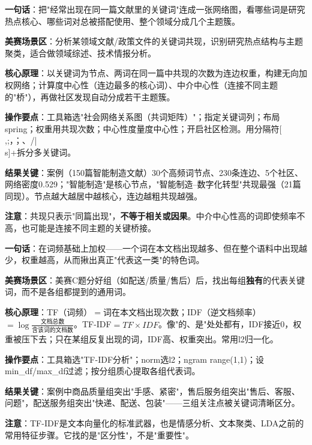\begin{algobrief}
\textbf{一句话}：把"经常出现在同一篇文献里的关键词"连成一张网络图，看哪些词是研究热点核心、哪些词对总被搭配使用、整个领域分成几个主题簇。

\textbf{美赛场景区}：分析某领域文献/政策文件的关键词共现，识别研究热点结构与主题聚类，适合做领域综述、技术情报分析。

\textbf{核心原理}：以关键词为节点、两词在同一篇中共现的次数为连边权重，构建无向加权网络；计算度中心性（连边最多的核心词）、中介中心性（连接不同主题的"桥"），再做社区发现自动分成若干主题簇。

\textbf{操作要点}：工具箱选"社会网络关系图（共词矩阵）"；指定关键词列；布局spring；权重用共现次数；中心性度量度中心性；开启社区检测。用分隔符[ ,;，；、/|\\s]+拆分多关键词。

\textbf{结果关键}：案例（150篇智能制造文献）30个高频词节点、230条连边、5个社区、网络密度0.529；"智能制造"是核心节点，"智能制造--数字化转型"共现最强（21篇同现）。节点越大越居中越核心，连边越粗共现越强。

\textbf{注意}：共现只表示"同篇出现"，\textbf{不等于相关或因果}。中介中心性高的词即使频率不高，也可能是连接不同主题的关键桥接。
\end{algobrief}


\begin{algobrief}
\textbf{一句话}：在词频基础上加权——一个词在本文档出现越多、但在整个语料中出现越少，权重越高，从而揪出真正"代表这一类"的特色词。

\textbf{美赛场景区}：美赛C题分好组（如配送/质量/售后）后，找出每组\textbf{独有}的代表关键词，而不是各组都提到的通用词。

\textbf{核心原理}：TF（词频）$=$词在本文档出现次数；IDF（逆文档频率）$=\log\frac{\text{文档总数}}{\text{含该词的文档数}}$。TF-IDF$=TF\times IDF$。像"的、是"处处都有，IDF接近0，权重被压下去；只在某组反复出现的词，IDF高、权重突出。常用l2归一化。

\textbf{操作要点}：工具箱选"TF-IDF分析"；norm选l2；ngram range(1,1)；设min\_df/max\_df过滤；按分组质心提取各组代表词。

\textbf{结果关键}：案例中商品质量组突出"手感、紧密"，售后服务组突出"售后、客服、问题"，配送服务组突出"快递、配送、包装"——三组关注点被关键词清晰区分。

\textbf{注意}：TF-IDF是文本向量化的标准武器，也是情感分析、文本聚类、LDA之前的常用特征步骤。它找的是"区分性"，不是"重要性"。
\end{algobrief}

